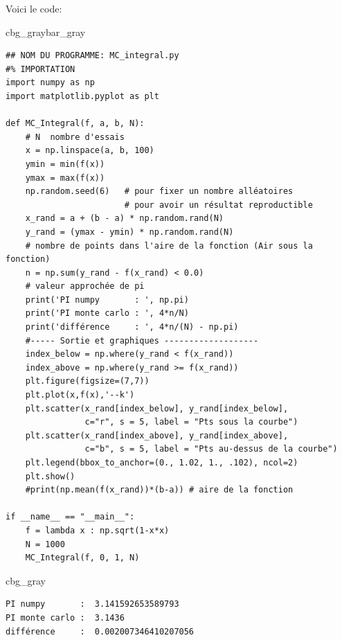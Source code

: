 \documentclass[%
oneside,                 %
final,                   %
10pt]{article}
\newenvironment{_cod_tight}[1]{
   \def\FrameCommand{\colorbox{#1}}
   \FrameRule0.6pt\MakeFramed {\FrameRestore}\vskip3mm}
   {\vskip0mm\endMakeFramed}
\newenvironment{cod}[1]{
\bgroup\rmfamily
\fboxsep=0mm\relax
\begin{_cod_tight}{#1}
\list{}{\parsep=-2mm\parskip=0mm\topsep=0pt\leftmargin=2mm
\rightmargin=2\leftmargin\leftmargin=4pt\relax}
\item\relax}
{\endlist\end{_cod_tight}\egroup}
\newenvironment{_pro_tight}[2]{
   \def\FrameCommand{\color{#2}\vrule width 1mm\normalcolor\colorbox{#1}}
   \FrameRule0.6pt\MakeFramed {\advance\hsize-2mm\FrameRestore}\vskip3mm}
   {\vskip0mm\endMakeFramed}
\newenvironment{pro}[2]{
\bgroup\rmfamily
\fboxsep=0mm\relax
\begin{_pro_tight}{#1}{#2}
\list{}{\parsep=-2mm\parskip=0mm\topsep=0pt\leftmargin=2mm
\rightmargin=2\leftmargin\leftmargin=4pt\relax}
\item\relax}
{\endlist\end{_pro_tight}\egroup}
\begin{document}
Voici le code:

\begin{pro}{cbg_gray}{bar_gray}\begin{verbatim}
## NOM DU PROGRAMME: MC_integral.py
#% IMPORTATION
import numpy as np
import matplotlib.pyplot as plt

def MC_Integral(f, a, b, N):
    # N  nombre d'essais
    x = np.linspace(a, b, 100)
    ymin = min(f(x))
    ymax = max(f(x))
    np.random.seed(6)   # pour fixer un nombre alléatoires
                        # pour avoir un résultat reproductible
    x_rand = a + (b - a) * np.random.rand(N)
    y_rand = (ymax - ymin) * np.random.rand(N)
    # nombre de points dans l'aire de la fonction (Air sous la fonction)
    n = np.sum(y_rand - f(x_rand) < 0.0)
    # valeur approchée de pi
    print('PI numpy       : ', np.pi)
    print('PI monte carlo : ', 4*n/N)
    print('différence     : ', 4*n/(N) - np.pi)
    #----- Sortie et graphiques -------------------
    index_below = np.where(y_rand < f(x_rand))
    index_above = np.where(y_rand >= f(x_rand))
    plt.figure(figsize=(7,7))
    plt.plot(x,f(x),'--k')
    plt.scatter(x_rand[index_below], y_rand[index_below],
                c="r", s = 5, label = "Pts sous la courbe")
    plt.scatter(x_rand[index_above], y_rand[index_above],
                c="b", s = 5, label = "Pts au-dessus de la courbe")
    plt.legend(bbox_to_anchor=(0., 1.02, 1., .102), ncol=2)
    plt.show()
    #print(np.mean(f(x_rand))*(b-a)) # aire de la fonction
    
if __name__ == "__main__":
    f = lambda x : np.sqrt(1-x*x)
    N = 1000
    MC_Integral(f, 0, 1, N)
\end{verbatim}
\end{pro}
\noindent
\begin{cod}{cbg_gray}\begin{verbatim}
PI numpy       :  3.141592653589793
PI monte carlo :  3.1436
différence     :  0.002007346410207056
\end{verbatim}
\end{cod}
\noindent


\vspace{6mm}
\end{document}
